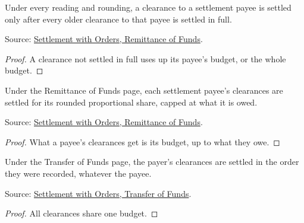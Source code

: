 \begin{theorem}
  \label{thm:accounting-allocation-oldest-first}
  Under every reading and rounding, a clearance to a settlement payee is
  settled only after every older clearance to that payee is settled in
  full.

  Source: \href{https://standards.atlassian.net/wiki/spaces/SWO/pages/574718145}{Settlement with Orders, Remittance of Funds}.
\end{theorem}
\begin{proof}
  A clearance not settled in full uses up its payee's budget, or the
  whole budget.
\end{proof}

\begin{theorem}
  \label{thm:accounting-proportional-share}
  Under the Remittance of Funds page, each settlement payee's clearances
  are settled for its rounded proportional share, capped at what it is
  owed.

  Source: \href{https://standards.atlassian.net/wiki/spaces/SWO/pages/574718145}{Settlement with Orders, Remittance of Funds}.
\end{theorem}
\begin{proof}
  What a payee's clearances get is its budget, up to what they owe.
\end{proof}

\begin{theorem}
  \label{thm:accounting-transfer-oldest-first}
  Under the Transfer of Funds page, the payer's clearances are settled in
  the order they were recorded, whatever the payee.

  Source: \href{https://standards.atlassian.net/wiki/spaces/SWO/pages/574488849}{Settlement with Orders, Transfer of Funds}.
\end{theorem}
\begin{proof}
  All clearances share one budget.
\end{proof}

